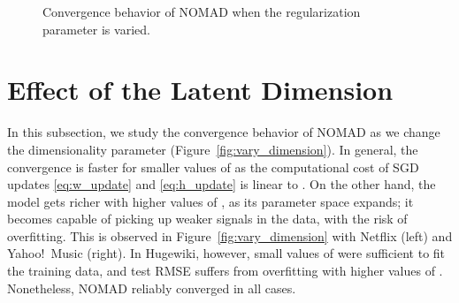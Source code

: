 \documentclass{vldb}
\begin{document}
\begin{figure*}[htbp]

  \caption{Convergence behavior of NOMAD when the regularization
    parameter  is varied.}
  \label{fig:vary_regularization}
\end{figure*}


\section{Effect of the Latent Dimension}
\label{sec:EffectLatentDimens}

In this subsection, we study the convergence behavior of NOMAD
as we change the dimensionality parameter 
(Figure~\ref{fig:vary_dimension}).  In general, the convergence is
faster for smaller values of  as the computational cost of SGD
updates \eqref{eq:w_update} and \eqref{eq:h_update} is linear to .
On the other hand, the model gets richer with higher values of , as
its parameter space expands; it becomes capable of picking up weaker
signals in the data, with the risk of overfitting.  This is observed
in Figure~\ref{fig:vary_dimension} with Netflix (left) and
Yahoo!~Music (right).  In Hugewiki, however, small
values of  were sufficient to fit the training data, and test RMSE
suffers from overfitting with higher values of .  Nonetheless,
NOMAD reliably converged in all cases.
\end{document}
